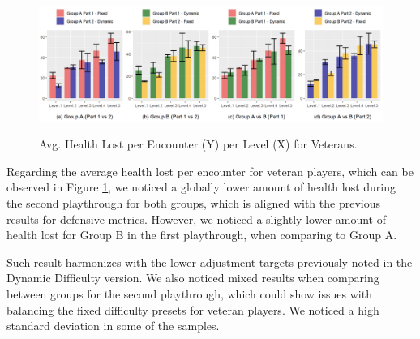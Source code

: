 \begin{figure}[!ht]
    \begin{center}
    \caption{Avg. Health Lost per Encounter (Y) per Level (X) for Veterans.}
        \includegraphics[width=\textwidth]{figures/health_lost_per_encounter-veteran_players.png}
        \label{fig:result-metric-veterans-health-lost-per-encounter}
    \end{center}
\end{figure}

Regarding the average health lost per encounter for veteran players, which can be observed in Figure \ref{fig:result-metric-veterans-health-lost-per-encounter}, we noticed a globally lower amount of health lost during the second playthrough for both groups, which is aligned with the previous results for defensive metrics. However, we noticed a slightly lower amount of health lost for Group B in the first playthrough, when comparing to Group A.

Such result harmonizes with the lower adjustment targets previously noted in the Dynamic Difficulty version. We also noticed mixed results when comparing between groups for the second playthrough, which could show issues with balancing the fixed difficulty presets for veteran players. We noticed a high standard deviation in some of the samples.


